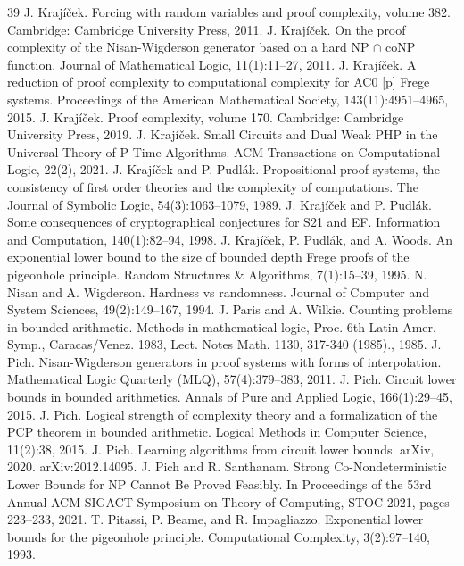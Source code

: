 \documentclass[10pt,a4paper]{article}
\begin{document}
\begin{thebibliography}{39}
 J. Krajíček. Forcing with random variables and proof complexity, volume 382. Cambridge: Cambridge University Press, 2011.
 J. Krajíček. On the proof complexity of the Nisan-Wigderson generator based on a hard NP $\cap$ coNP function. Journal of Mathematical Logic, 11(1):11–27, 2011.
 J. Krajíček. A reduction of proof complexity to computational complexity for AC0 [p] Frege systems. Proceedings of the American Mathematical Society, 143(11):4951–4965, 2015.
 J. Krajíček. Proof complexity, volume 170. Cambridge: Cambridge University Press, 2019.
 J. Krajíček. Small Circuits and Dual Weak PHP in the Universal Theory of P-Time Algorithms. ACM Transactions on Computational Logic, 22(2), 2021.
 J. Krajíček and P. Pudlák. Propositional proof systems, the consistency of first order theories and the complexity of computations. The Journal of Symbolic Logic, 54(3):1063–1079, 1989.
 J. Krajíček and P. Pudlák. Some consequences of cryptographical conjectures for S21 and EF. Information and Computation, 140(1):82–94, 1998.
 J. Krajíček, P. Pudlák, and A. Woods. An exponential lower bound to the size of bounded depth Frege proofs of the pigeonhole principle. Random Structures \& Algorithms, 7(1):15–39, 1995.
 N. Nisan and A. Wigderson. Hardness vs randomness. Journal of Computer and System Sciences, 49(2):149–167, 1994.
 J. Paris and A. Wilkie. Counting problems in bounded arithmetic. Methods in mathematical logic, Proc. 6th Latin Amer. Symp., Caracas/Venez. 1983, Lect. Notes Math. 1130, 317-340 (1985)., 1985.
 J. Pich. Nisan-Wigderson generators in proof systems with forms of interpolation. Mathematical Logic Quarterly (MLQ), 57(4):379–383, 2011.
 J. Pich. Circuit lower bounds in bounded arithmetics. Annals of Pure and Applied Logic, 166(1):29–45, 2015.
 J. Pich. Logical strength of complexity theory and a formalization of the PCP theorem in bounded arithmetic. Logical Methods in Computer Science, 11(2):38, 2015.
 J. Pich. Learning algorithms from circuit lower bounds. arXiv, 2020. arXiv:2012.14095.
 J. Pich and R. Santhanam. Strong Co-Nondeterministic Lower Bounds for NP Cannot Be Proved Feasibly. In Proceedings of the 53rd Annual ACM SIGACT Symposium on Theory of Computing, STOC 2021, pages 223–233, 2021.
 T. Pitassi, P. Beame, and R. Impagliazzo. Exponential lower bounds for the pigeonhole principle. Computational Complexity, 3(2):97–140, 1993.

\end{thebibliography}
\end{document}
